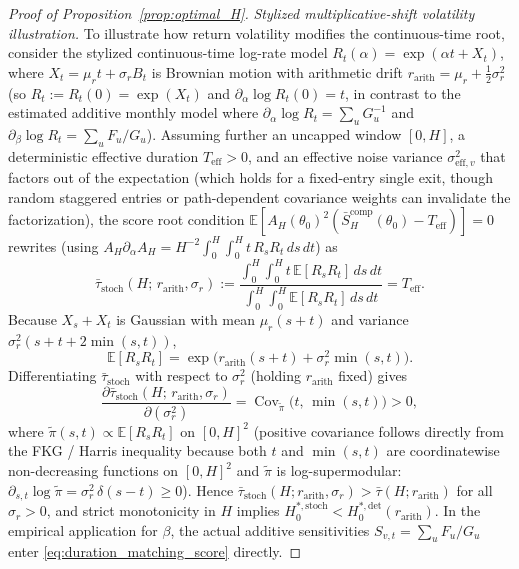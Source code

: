 \begin{proof}[Proof of Proposition~\ref{prop:optimal_H}]
\emph{Stylized multiplicative-shift volatility illustration.} To illustrate how return volatility modifies the continuous-time root, consider the stylized continuous-time log-rate model $R_t(\alpha) = \exp(\alpha t + X_t)$, where $X_t = \mu_r t + \sigma_r B_t$ is Brownian motion with arithmetic drift $r_{\mathrm{arith}} = \mu_r + \frac{1}{2}\sigma_r^2$ (so $R_t := R_t(0) = \exp(X_t)$ and $\partial_\alpha \log R_t(0) = t$, in contrast to the estimated additive monthly model where $\partial_\alpha \log R_t = \sum_u G_u^{-1}$ and $\partial_\beta \log R_t = \sum_u F_u/G_u$). Assuming further an uncapped window $[0,H]$, a deterministic effective duration $T_{\mathrm{eff}} > 0$, and an effective noise variance $\sigma_{\mathrm{eff},v}^2$ that factors out of the expectation (which holds for a fixed-entry single exit, though random staggered entries or path-dependent covariance weights can invalidate the factorization), the score root condition $\mathbb{E}[A_H(\theta_0)^2(\bar{S}_H^{\mathrm{comp}}(\theta_0) - T_{\mathrm{eff}})] = 0$ rewrites (using $A_H \partial_\alpha A_H = H^{-2}\int_0^H\int_0^H t\,R_s R_t\,ds\,dt$) as
\[
\bar\tau_{\mathrm{stoch}}(H;\,r_{\mathrm{arith}},\sigma_r)
:= \frac{\int_0^H\int_0^H t\,\mathbb{E}[R_s R_t]\,ds\,dt}{\int_0^H\int_0^H \mathbb{E}[R_s R_t]\,ds\,dt}
= T_{\mathrm{eff}}.
\]
Because $X_s + X_t$ is Gaussian with mean $\mu_r(s+t)$ and variance $\sigma_r^2(s + t + 2\min(s,t))$,
\[
\mathbb{E}[R_s R_t] = \exp\!\Big(r_{\mathrm{arith}}(s+t) + \sigma_r^2\min(s,t)\Big).
\]
Differentiating $\bar\tau_{\mathrm{stoch}}$ with respect to $\sigma_r^2$ (holding $r_{\mathrm{arith}}$ fixed) gives
\[
\frac{\partial \bar\tau_{\mathrm{stoch}}(H;\,r_{\mathrm{arith}},\sigma_r)}{\partial (\sigma_r^2)}
= \operatorname{Cov}_{\tilde\pi}\!\bigl(t,\,\min(s,t)\bigr) > 0,
\]
where $\tilde\pi(s,t) \propto \mathbb{E}[R_s R_t]$ on $[0,H]^2$ (positive covariance follows directly from the FKG / Harris inequality because both $t$ and $\min(s,t)$ are coordinatewise non-decreasing functions on $[0,H]^2$ and $\tilde\pi$ is log-supermodular: $\partial_{s,t}\log\tilde\pi = \sigma_r^2\,\delta(s-t) \ge 0$).
Hence $\bar\tau_{\mathrm{stoch}}(H; r_{\mathrm{arith}}, \sigma_r) > \bar\tau(H; r_{\mathrm{arith}})$ for all $\sigma_r > 0$, and strict monotonicity in $H$ implies $H_0^{\ast,\mathrm{stoch}} < H_0^{\ast,\mathrm{det}}(r_{\mathrm{arith}})$. In the empirical application for $\beta$, the actual additive sensitivities $S_{v,t} = \sum_u F_u/G_u$ enter \eqref{eq:duration_matching_score} directly.


\end{proof}

